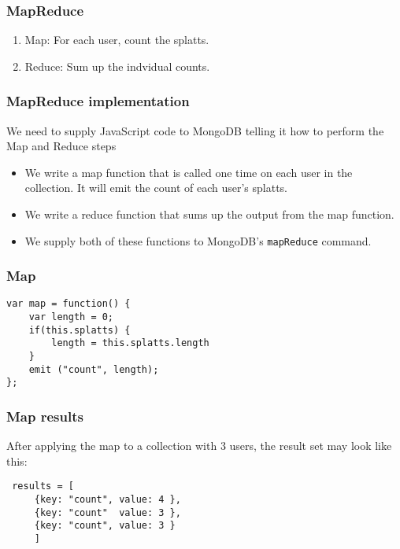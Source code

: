 \documentclass[10pt]{beamer}
\begin{document}
\begin{frame}
  \frametitle{MapReduce}

 \begin{enumerate}
  \item Map:  For each user, count the splatts.
  \item Reduce: Sum up the indvidual counts.
 \end{enumerate}

\end{frame}


\begin{frame}[fragile]
  \frametitle{MapReduce implementation}

  We need to supply JavaScript code to MongoDB telling it
  how to perform the Map and Reduce steps
 \begin{itemize}
  \item We write a map function that is called one time on
	  each user in the collection.  It will emit the 
	  count of each user's splatts.
  \item We write a reduce function that sums up the output from the 
	  map function.
  \item We supply both of these functions to MongoDB's \texttt{mapReduce} command.
 \end{itemize}

\end{frame}



\begin{frame}[fragile]
  \frametitle{Map}

 \begin{verbatim}
var map = function() { 
    var length = 0;
    if(this.splatts) {
        length = this.splatts.length
    }
    emit ("count", length); 
};
 \end{verbatim}

\end{frame}


\begin{frame}[fragile]
  \frametitle{Map results}

 After applying the map to a collection with 3 users, the result set
 may look like this:
 \begin{verbatim}
 results = [
     {key: "count", value: 4 },
     {key: "count"  value: 3 },
     {key: "count", value: 3 }
     ]
 \end{verbatim}

\end{frame}
\end{document}
